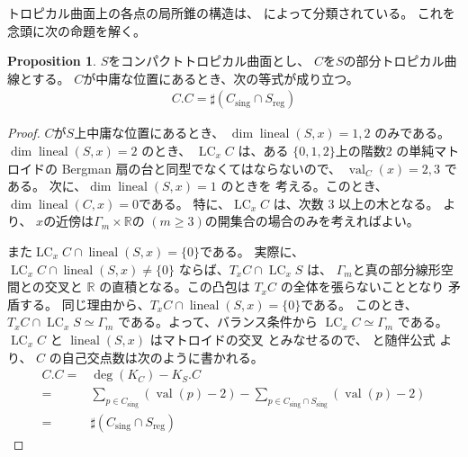 \documentclass[a4paper,dvipdfmx,reqno,12pt]{amsart}
\theoremstyle{definition}
\newtheorem{proposition}[theorem]{Proposition}
\newcommand{\opn}[1]{\operatorname{#1}}
\numberwithin{equation}{section}
\begin{document}
トロピカル曲面上の各点の局所錐の構造は、
\cite[Corollary 2.4]{shaw2015tropical}
によって分類されている。
これを念頭に次の命題を解く。

\begin{proposition}
\label{proposition-self-intersection}
$S$をコンパクトトロピカル曲面とし、
$C$を$S$の部分トロピカル曲線とする。
$C$が中庸な位置にあるとき、次の等式が成り立つ。
\begin{align}
     C.C=\sharp (C_{\mathrm{sing}}\cap S_{\mathrm{reg}})
\end{align}
\end{proposition}
\begin{proof}
$C$が$S$上中庸な位置にあるとき、
$\dim \opn{lineal}(S,x)=1,2$ のみである。
$\dim \opn{lineal}(S,x)=2$ のとき、
$\opn{LC}_x C$ は、ある
$\{0,1,2\}$上の階数$2$
の単純マトロイドの
Bergman 扇の台と同型でなくてはならないので、
$\opn{val}_C(x)=2,3$ である。
次に、$\dim \opn{lineal}(S,x)=1$ のときを
考える。このとき、
$\dim \opn{lineal}(C,x)=0$である。
特に、$\opn{LC}_x C$ は、次数 $3$ 以上の木となる。
\cite[Corollary 2.4]{shaw2015tropical} 
より、
$x$の近傍は$\Gamma_m\times \mathbb{R}$の
$(m\geq 3)$の開集合の場合のみを考えればよい。

また$\opn{LC}_x C\cap \opn{lineal}(S,x)=\{0\}$である。
実際に、$\opn{LC}_x C\cap \opn{lineal}(S,x)\ne \{0\}$
ならば、$T_x C \cap \opn{LC}_x S$ は、
$\Gamma_m$と真の部分線形空間との交叉と $\mathbb{R}$
の直積となる。この凸包は $T_x C$ の全体を張らないこととなり
矛盾する。
同じ理由から、$T_x C\cap \opn{lineal}(S,x)=\{0\}$である。
このとき、$T_x C\cap \opn{LC}_x S\simeq \Gamma_m$
である。よって、バランス条件から
$\opn{LC}_x C\simeq \Gamma_m$ である。
$\opn{LC}_x C$ と $\opn{lineal}(S,x)$ はマトロイドの交叉
とみなせるので、\cite[Theorem 4.2]{MR3032930}
と随伴公式\cite[Theorem 4.11]{shaw2015tropical} より、
$C$ の自己交点数は次のように書かれる。
\begin{align}
C . C=&\opn{deg}(K_C)-K_S . C \\
=& \sum_{p\in C_{\mathrm{sing}}}(\opn{val}(p)-2)
- \sum_{p\in C_{\mathrm{sing}}\cap S_{\mathrm{sing}}}
(\opn{val}(p)-2) \\
=& \sharp (C_{\mathrm{sing}}\cap S_{\mathrm{reg}})
\end{align}

\end{proof}
\end{document}
